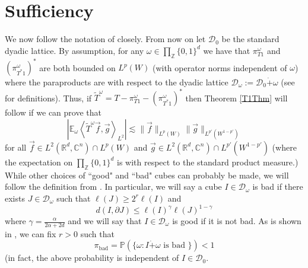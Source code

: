 \documentclass[12pt,reqno ]{amsart}
\numberwithin{equation}{section}
\theoremstyle{definition}
\newcommand{\C}{\ensuremath{\mathbb{C}^n}}
\newcommand{\Ew}{\ensuremath{\mathbb{E}_\omega}}
\newcommand{\Z}{\ensuremath{\mathbb{Z}}}
\newcommand{\Rd}{\ensuremath{\mathbb{R}^d}}
\newcommand{\D}{\ensuremath{\mathscr{D}}}
\newcommand{\Dw}{\ensuremath{\mathscr{D}_\omega}}
\newcommand{\ip}[2]{\ensuremath{\left\langle#1,#2\right\rangle}}
\newcommand{\T}[1]{\ensuremath{\text{#1}}}
\begin{document}
\section{Sufficiency}







     We now follow the notation of \cite{H} closely. From now on let $\D_0$ be the standard dyadic lattice. By assumption, for any $\omega \in \prod_{\Z} \{0, 1\}^d$ we have that $\pi ^{\omega} _{T1}$ and $(\pi ^{\omega} _{T^*1})^*$ are both bounded on $L^p(W)$ (with operator norms independent of $\omega$)  where the paraproducts are with respect to the dyadic lattice $\Dw := \D_0 \dot+ \omega$ (see \cite{H} for definitions).     Thus, if $\widetilde{T} ^\omega = T - \pi ^{\omega} _{T1} - (\pi ^{\omega} _{T^*1})^*$ then Theorem \ref{T1Thm} will follow if we can prove that \begin{equation*} \left|\Ew \ip{\widetilde{T}^\omega \vec{f}}{\vec{g}}_{L^2} \right| \lesssim \|\vec{f}\|_{L^p(W)} \|\vec{g}\|_{L^{p'}(W^{1 -p'})} \end{equation*} for all $\vec{f} \in L^2(\Rd, \C) \cap L^p(W)$ and $ \vec{g} \in L^2(\Rd, \C) \cap L^{p'} (W^{1-p'})$ (where the expectation on $\prod_{\Z} \{0, 1\}^d$ is with respect to the standard product measure.)  \\


While other choices of ``good" and ``bad" cubes can probably be made, we will follow the definition from \cite{NTV}.  In particular, we will say a cube $I \in \Dw$ is bad if there exists $J \in \Dw$ such that $\ell(J) \geq 2^r \ell(I)$ and \begin{equation*} d (I, \partial J) \leq \ell(I)^\gamma \ell(J)^{1 - \gamma} \end{equation*} where $\gamma  = \frac{\alpha}{2\alpha + 2d}$ and we will say that $I \in \Dw$ is good if it is not bad.  As is shown in \cite{H}, we can fix $r > 0$ such that \begin{equation*} \pi_{\T{bad}} = \mathbb{P}(\{\omega : I \dot+ \omega \T{ is bad }\}) < 1 \end{equation*} (in fact, the above probability is  independent of $I \in \D_0$.
\end{document}
